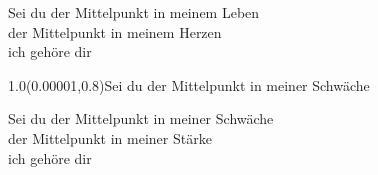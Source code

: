 \documentclass[aspectratio=169]{beamer}
\begin{document}
\begin{frame}
\centering
\color{white}
\huge{Sei du der Mittelpunkt in meinem Leben} \\
\huge{der Mittelpunkt in meinem Herzen} \\
\huge{ich gehöre dir} \\

\begin{textblock}{1.0}(0.00001,0.8)\color{gray}\normalsize{Sei du der Mittelpunkt in meiner Schwäche}\end{textblock}
\end{frame}

\begin{frame}
\centering
\color{white}
\huge{Sei du der Mittelpunkt in meiner Schwäche} \\
\huge{der Mittelpunkt in meiner Stärke} \\
\huge{ich gehöre dir} \\
\end{frame}
\end{document}
